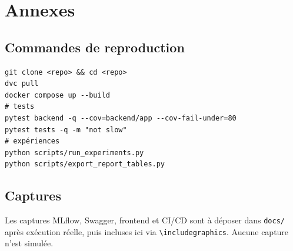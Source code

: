 \documentclass[11pt,a4paper]{article}
\begin{document}
\appendix
\section{Annexes}
\subsection{Commandes de reproduction}
\begin{lstlisting}
git clone <repo> && cd <repo>
dvc pull
docker compose up --build
# tests
pytest backend -q --cov=backend/app --cov-fail-under=80
pytest tests -q -m "not slow"
# expériences
python scripts/run_experiments.py
python scripts/export_report_tables.py
\end{lstlisting}

\subsection{Captures}
Les captures MLflow, Swagger, frontend et CI/CD sont à déposer dans
\texttt{docs/} après exécution réelle, puis incluses ici via
\texttt{\textbackslash includegraphics}. Aucune capture n'est simulée.



\end{document}
